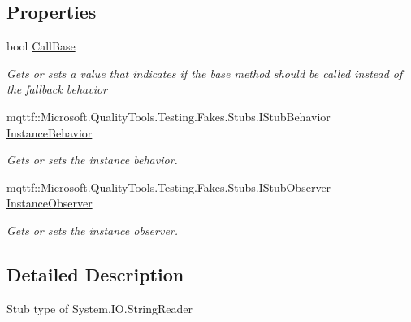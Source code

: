 \subsection*{Properties}
\begin{DoxyCompactItemize}
\item 
bool \hyperlink{class_system_1_1_i_o_1_1_fakes_1_1_stub_string_reader_a425a7c7ebf4df2a054031858aa701e60}{Call\-Base}
\begin{DoxyCompactList}\small\item\em Gets or sets a value that indicates if the base method should be called instead of the fallback behavior\end{DoxyCompactList}\item 
mqttf\-::\-Microsoft.\-Quality\-Tools.\-Testing.\-Fakes.\-Stubs.\-I\-Stub\-Behavior \hyperlink{class_system_1_1_i_o_1_1_fakes_1_1_stub_string_reader_adf7e22b23ca5e4e32205793f46125705}{Instance\-Behavior}
\begin{DoxyCompactList}\small\item\em Gets or sets the instance behavior.\end{DoxyCompactList}\item 
mqttf\-::\-Microsoft.\-Quality\-Tools.\-Testing.\-Fakes.\-Stubs.\-I\-Stub\-Observer \hyperlink{class_system_1_1_i_o_1_1_fakes_1_1_stub_string_reader_addc053636e0c0559b6ad6e9a79b2d613}{Instance\-Observer}
\begin{DoxyCompactList}\small\item\em Gets or sets the instance observer.\end{DoxyCompactList}\end{DoxyCompactItemize}


\subsection{Detailed Description}
Stub type of System.\-I\-O.\-String\-Reader



